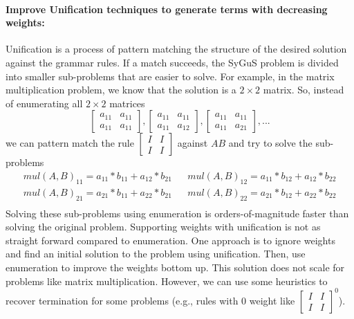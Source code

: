 \paragraph{Improve Unification techniques to generate terms with decreasing weights:}
%
Unification is a process of pattern matching the structure of the desired solution against the grammar rules.
%
If a match succeeds, the SyGuS problem is divided into smaller sub-problems that are easier to solve.
%
For example, in the matrix multiplication problem, we know that the solution is a $2 \times 2$ matrix. So, instead of enumerating all $2 \times 2$ matrices
%
\[
\begin{bmatrix} a_{11} & a_{11} \\ a_{11} & a_{11} \end{bmatrix},
\begin{bmatrix} a_{11} & a_{11} \\ a_{11} & a_{12} \end{bmatrix},
\begin{bmatrix} a_{11} & a_{11} \\ a_{11} & a_{21} \end{bmatrix},
...
\]
%
we can pattern match the rule $\begin{bmatrix} I & I \\ I & I \end{bmatrix}$ against $AB$ and try to solve the sub-problems
\[
\begin{matrix}
    mul(A,B)_{11} = a_{11} * b_{11} + a_{12} * b_{21} &&
    mul(A,B)_{12} = a_{11} * b_{12} + a_{12} * b_{22} \\
    mul(A,B)_{21} = a_{21} * b_{11} + a_{22} * b_{21} &&
    mul(A,B)_{22} = a_{21} * b_{12} + a_{22} * b_{22} \\
\end{matrix}
\]
%
Solving these sub-problems using enumeration is orders-of-magnitude faster than solving the original problem.
%
Supporting weights with unification is not as straight forward compared to enumeration.
%
One approach is to ignore weights and find an initial solution to the problem using unification.
%
Then, use enumeration to improve the weights bottom up.
%
This solution does not scale for problems like matrix multiplication.
%
However, we can use some heuristics to recover termination for some problems (e.g., rules with 0 weight like $\begin{bmatrix} I & I \\ I & I \end{bmatrix}^0$).
